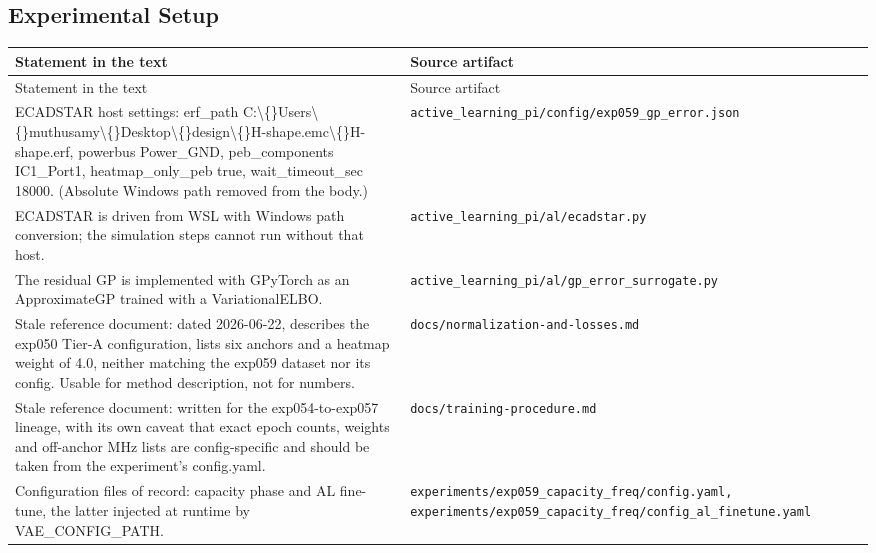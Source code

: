 \subsection*{Experimental Setup}
\begingroup\small
\begin{longtable}{p{} p{}}
\hline
Statement in the text & Source artifact \\
\hline
\endfirsthead
\hline
Statement in the text & Source artifact \\
\hline
\endhead
ECADSTAR host settings: erf\_path C:\textbackslash\{\}Users\textbackslash\{\}muthusamy\textbackslash\{\}Desktop\textbackslash\{\}design\textbackslash\{\}H-shape.emc\textbackslash\{\}H-shape.erf, powerbus Power\_GND, peb\_components IC1\_Port1, heatmap\_only\_peb true, wait\_timeout\_sec 18000. (Absolute Windows path removed from the body.) & \texttt{active\_\allowbreak{}learning\_\allowbreak{}pi/\allowbreak{}config/\allowbreak{}exp059\_\allowbreak{}gp\_\allowbreak{}error.json} \\
ECADSTAR is driven from WSL with Windows path conversion; the simulation steps cannot run without that host. & \texttt{active\_\allowbreak{}learning\_\allowbreak{}pi/\allowbreak{}al/\allowbreak{}ecadstar.py} \\
The residual GP is implemented with GPyTorch as an ApproximateGP trained with a VariationalELBO. & \texttt{active\_\allowbreak{}learning\_\allowbreak{}pi/\allowbreak{}al/\allowbreak{}gp\_\allowbreak{}error\_\allowbreak{}surrogate.py} \\
Stale reference document: dated 2026-06-22, describes the exp050 Tier-A configuration, lists six anchors and a heatmap weight of 4.0, neither matching the exp059 dataset nor its config. Usable for method description, not for numbers. & \texttt{docs/\allowbreak{}normalization-and-losses.md} \\
Stale reference document: written for the exp054-to-exp057 lineage, with its own caveat that exact epoch counts, weights and off-anchor MHz lists are config-specific and should be taken from the experiment's config.yaml. & \texttt{docs/\allowbreak{}training-procedure.md} \\
Configuration files of record: capacity phase and AL fine-tune, the latter injected at runtime by VAE\_CONFIG\_PATH. & \texttt{experiments/\allowbreak{}exp059\_\allowbreak{}capacity\_\allowbreak{}freq/\allowbreak{}config.yaml, experiments/\allowbreak{}exp059\_\allowbreak{}capacity\_\allowbreak{}freq/\allowbreak{}config\_\allowbreak{}al\_\allowbreak{}finetune.yaml} \\
\hline
\end{longtable}
\endgroup


